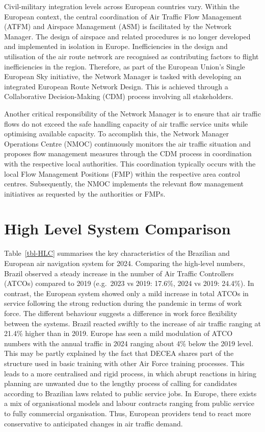 \documentclass[
  a4paper,
  DIV=11,
  numbers=noendperiod]{scrreport}
\begin{document}
Civil-military integration levels across European countries vary. Within
the European context, the central coordination of Air Traffic Flow
Management (ATFM) and Airspace Management (ASM) is facilitated by the
Network Manager. The design of airspace and related procedures is no
longer developed and implemented in isolation in Europe. Inefficiencies
in the design and utilisation of the air route network are recognised as
contributing factors to flight inefficiencies in the region. Therefore,
as part of the European Union's Single European Sky initiative, the
Network Manager is tasked with developing an integrated European Route
Network Design. This is achieved through a Collaborative Decision-Making
(CDM) process involving all stakeholders.

Another critical responsibility of the Network Manager is to ensure that
air traffic flows do not exceed the safe handling capacity of air
traffic service units while optimising available capacity. To accomplish
this, the Network Manager Operations Centre (NMOC) continuously monitors
the air traffic situation and proposes flow management measures through
the CDM process in coordination with the respective local authorities.
This coordination typically occurs with the local Flow Management
Positions (FMP) within the respective area control centres.
Subsequently, the NMOC implements the relevant flow management
initiatives as requested by the authorities or FMPs.

\section{High Level System
Comparison}\label{high-level-system-comparison}

Table~\ref{tbl-HLC} summarises the key characteristics of the Brazilian
and European air navigation system for 2024. Comparing the high-level
numbers, Brazil observed a steady increase in the number of Air Traffic
Controllers (ATCOs) compared to 2019 (e.g.~2023 vs 2019: 17.6\%, 2024 vs
2019: 24.4\%). In contrast, the European system showed only a mild
increase in total ATCOs in service following the strong reduction during
the pandemic in terms of work force. The different behaviour suggests a
difference in work force flexibility between the systems. Brazil reacted
swiftly to the increase of air traffic ranging at 21.4\% higher than in
2019. Europe has seen a mild modulation of ATCO numbers with the annual
traffic in 2024 ranging about 4\% below the 2019 level.\\
This may be partly explained by the fact that DECEA shares part of the
structure used in basic training with other Air Force training
processes. This leads to a more centralised and rigid process, in which
abrupt reactions in hiring planning are unwanted due to the lengthy
process of calling for candidates according to Brazilian laws related to
public service jobs. In Europe, there exists a mix of organisational
models and labour contracts ranging from public service to fully
commercial organisation. Thus, European providers tend to react more
conservative to anticipated changes in air traffic demand.
\end{document}
